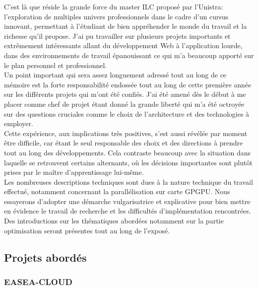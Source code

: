 \documentclass[french, 11pt]{memoir}
\begin{document}
\bigskip
C'est là que réside la grande force du master ILC proposé par l'Unistra:
l'exploration de multiples univers professionnels dans le cadre d'un
cursus innovant, permettant à l'étudiant de bien appréhender le monde du
travail et la richesse qu'il propose. J'ai pu travailler sur plusieurs
projets importants et extrêmement intéressants allant du développement
Web à l'application lourde, dans des environnements de travail
épanouissant ce qui m'a beaucoup apporté sur le plan personnel et
professionnel. \\
Un point important qui sera assez longuement adressé tout au long de ce
mémoire est la forte responsabilité endossée tout au long de cette
première année sur les différents projets qui m'ont été confiés. J'ai
été amené dès le début à me placer comme chef de projet étant donné la
grande liberté qui m'a été octroyée sur des questions cruciales comme le
choix de l'architecture et des technologies à employer.\\
Cette expérience, aux implications très positives, s'est aussi révélée
par moment être difficile, car étant le seul responsable des choix et
des directions à prendre tout au long des développements. Cela contraste
beaucoup avec la situation dans laquelle se retrouvent certains
alternants, où les décisions importantes sont plutôt prises par le
maître d'apprentissage lui-même.\\
Les nombreuses descriptions techniques sont dues à la nature technique
du travail effectué, notamment concernant la parallélisation sur carte
GPGPU. Nous essayerons d'adopter une démarche vulgarisatrice et
explicative pour bien mettre en évidence le travail de recherche et les
difficultés d'implémentation rencontrées. Des introductions sur les
thématiques abordées notamment sur la partie optimisation seront
présentes tout au long de l'exposé.

\subsection{Projets abordés}\label{projets-aborduxe9s}

\subsubsection{EASEA-CLOUD}\label{easea-cloud}
\end{document}
